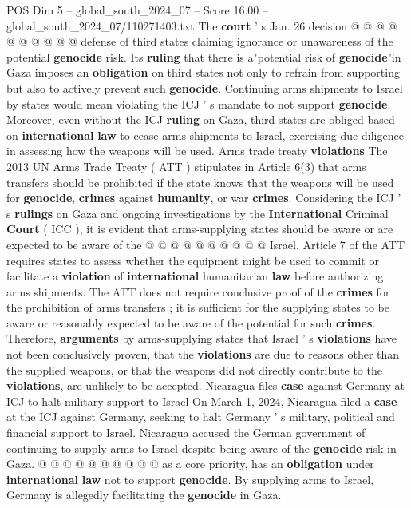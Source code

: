 \begin{textsample}{POS Dim 5 – global\_south\_2024\_07 – Score 16.00 – global\_south\_2024\_07/110271403.txt}
The \textbf{court} ' s Jan. 26 decision @ @ @ @ @ @ @ @ @ @ defense of third states claiming ignorance or unawareness of the potential \textbf{genocide} risk.
Its \textbf{ruling} that there is a"potential risk of \textbf{genocide}"in Gaza imposes an \textbf{obligation} on third states not only to refrain from supporting but also to actively prevent such \textbf{genocide}.
Continuing arms shipments to Israel by states would mean violating the ICJ ' s mandate to not support \textbf{genocide}.
Moreover, even without the ICJ \textbf{ruling} on Gaza, third states are obliged based on \textbf{international} \textbf{law} to cease arms shipments to Israel, exercising due diligence in assessing how the weapons will be used.
Arms trade treaty \textbf{violations} The 2013 UN Arms Trade Treaty ( ATT ) stipulates in Article 6(3) that arms transfers should be prohibited if the state knows that the weapons will be used for \textbf{genocide}, \textbf{crimes} against \textbf{humanity}, or war \textbf{crimes}.
Considering the ICJ ' s \textbf{rulings} on Gaza and ongoing investigations by the \textbf{International} Criminal \textbf{Court} ( ICC ), it is evident that arms-supplying states should be aware or are expected to be aware of the @ @ @ @ @ @ @ @ @ @ Israel.
Article 7 of the ATT requires states to assess whether the equipment might be used to commit or facilitate a \textbf{violation} of \textbf{international} humanitarian \textbf{law} before authorizing arms shipments.
The ATT does not require conclusive proof of the \textbf{crimes} for the prohibition of arms transfers ; it is sufficient for the supplying states to be aware or reasonably expected to be aware of the potential for such \textbf{crimes}.
Therefore, \textbf{arguments} by arms-supplying states that Israel ' s \textbf{violations} have not been conclusively proven, that the \textbf{violations} are due to reasons other than the supplied weapons, or that the weapons did not directly contribute to the \textbf{violations}, are unlikely to be accepted.
Nicaragua files \textbf{case} against Germany at ICJ to halt military support to Israel On March 1, 2024, Nicaragua filed a \textbf{case} at the ICJ against Germany, seeking to halt Germany ' s military, political and financial support to Israel.
Nicaragua accused the German government of continuing to supply arms to Israel despite being aware of the \textbf{genocide} risk in Gaza. @ @ @ @ @ @ @ @ @ @ as a core priority, has an \textbf{obligation} under \textbf{international} \textbf{law} not to support \textbf{genocide}.
By supplying arms to Israel, Germany is allegedly facilitating the \textbf{genocide} in Gaza.

\end{textsample}
